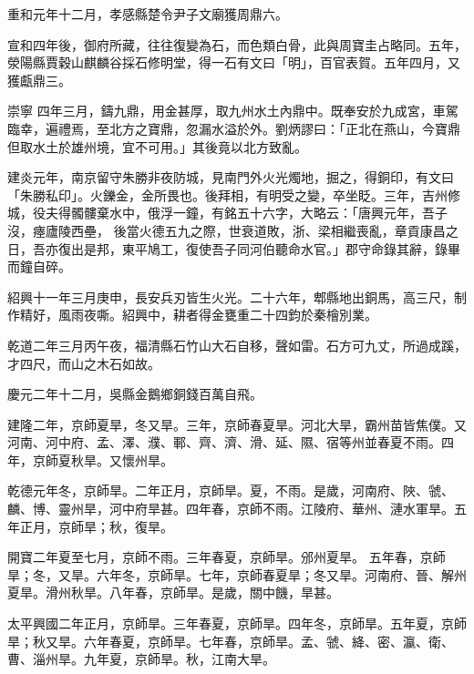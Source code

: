 \begin{pinyinscope}
 重和元年十二月，孝感縣楚令尹子文廟獲周鼎六。



 宣和四年後，御府所藏，往往復變為石，而色類白骨，此與周寶圭占略同。五年，滎陽縣賈穀山麒麟谷採石修明堂，得一石有文曰「明」，百官表賀。五年四月，又獲甗鼎三。



 崇寧
 四年三月，鑄九鼎，用金甚厚，取九州水土內鼎中。既奉安於九成宮，車駕臨幸，遍禮焉，至北方之寶鼎，忽漏水溢於外。劉炳謬曰：「正北在燕山，今寶鼎但取水土於雄州境，宜不可用。」其後竟以北方致亂。



 建炎元年，南京留守朱勝非夜防城，見南門外火光燭地，掘之，得銅印，有文曰「朱勝私印」。火鑠金，金所畏也。後拜相，有明受之變，卒坐眨。三年，吉州修城，役夫得髑髏棄水中，俄浮一鐘，有銘五十六字，大略云：「唐興元年，吾子沒，瘞廬陵西壘，
 後當火德五九之際，世衰道敗，浙、梁相繼喪亂，章貢康昌之日，吾亦復出是邦，東平鳩工，復使吾子同河伯聽命水官。」郡守命錄其辭，錄畢而鐘自碎。



 紹興十一年三月庚申，長安兵刃皆生火光。二十六年，郫縣地出銅馬，高三尺，制作精好，風雨夜嘶。紹興中，耕者得金甕重二十四鈞於秦檜別業。



 乾道二年三月丙午夜，福清縣石竹山大石自移，聲如雷。石方可九丈，所過成蹊，才四尺，而山之木石如故。



 慶元二年十二月，吳縣金鵝鄉銅錢百萬自飛。



 建隆二年，京師夏旱，冬又旱。三年，京師春夏旱。河北大旱，霸州苗皆焦僕。又河南、河中府、孟、澤、濮、鄆、齊、濟、滑、延、隰、宿等州並春夏不雨。四年，京師夏秋旱。又懷州旱。



 乾德元年冬，京師旱。二年正月，京師旱。夏，不雨。是歲，河南府、陜、虢、麟、博、靈州旱，河中府旱甚。四年春，京師不雨。江陵府、華州、漣水軍旱。五年正月，京師旱；秋，復旱。



 開寶二年夏至七月，京師不雨。三年春夏，京師旱。邠州夏旱。
 五年春，京師旱；冬，又旱。六年冬，京師旱。七年，京師春夏旱；冬又旱。河南府、晉、解州夏旱。滑州秋旱。八年春，京師旱。是歲，關中饑，旱甚。



 太平興國二年正月，京師旱。三年春夏，京師旱。四年冬，京師旱。五年夏，京師旱；秋又旱。六年春夏，京師旱。七年春，京師旱。孟、虢、絳、密、瀛、衛、曹、淄州旱。九年夏，京師旱。秋，江南大旱。




\end{pinyinscope}
